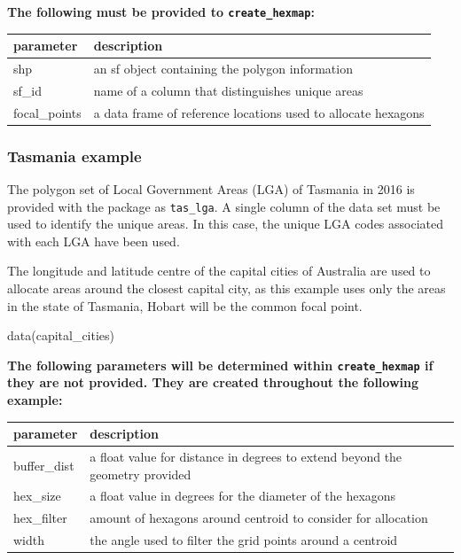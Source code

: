 \textbf{The following must be provided to \texttt{create\_hexmap}:}

\begin{Schunk}

\begin{tabular}{l|l}
\hline
parameter & description\\
\hline
shp & an sf object containing the polygon information\\
\hline
sf\_id & name of a column that distinguishes unique areas\\
\hline
focal\_points & a data frame of reference locations used to allocate hexagons\\
\hline
\end{tabular}

\end{Schunk}

\hypertarget{tasmania-example}{%
\subsubsection{Tasmania example}\label{tasmania-example}}

The polygon set of Local Government Areas (LGA) of Tasmania in 2016 is
provided with the  package as \texttt{tas\_lga}. A
single column of the data set must be used to identify the unique areas.
In this case, the unique LGA codes associated with each LGA have been
used.

The longitude and latitude centre of the capital cities of Australia are
used to allocate areas around the closest capital city, as this example
uses only the areas in the state of Tasmania, Hobart will be the common
focal point.

\begin{Schunk}
\begin{Sinput}
data(capital_cities)
\end{Sinput}
\end{Schunk}

\textbf{The following parameters will be determined within
\texttt{create\_hexmap} if they are not provided. They are created
throughout the following example:}

\begin{Schunk}

\begin{tabular}{l|l}
\hline
parameter & description\\
\hline
buffer\_dist & a float value for distance in degrees to extend beyond the geometry provided\\
\hline
hex\_size & a float value in degrees for the diameter of the hexagons\\
\hline
hex\_filter & amount of hexagons around centroid to consider for allocation\\
\hline
width & the angle used to filter the grid points around a centroid\\
\hline
\end{tabular}

\end{Schunk}

